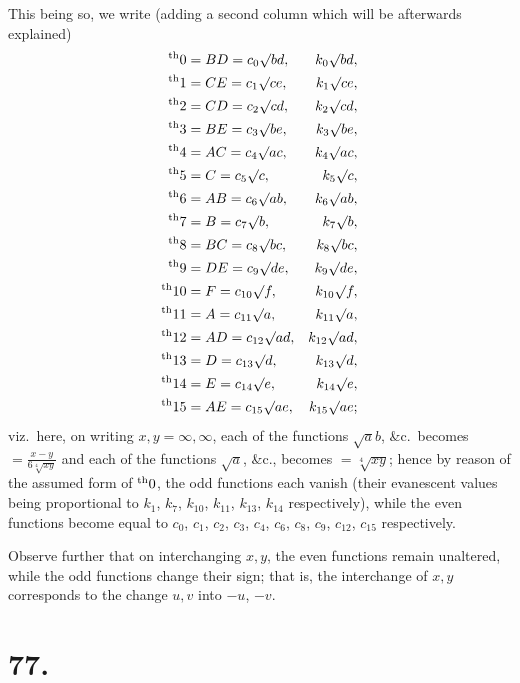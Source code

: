\documentclass[11pt,a4paper]{book}
\providecommand{\uth}{\textsuperscript{th}}
\begin{document}
This being so, we write (adding a second column which will be afterwards explained)
\begin{align*}
\uth{0} &= BD = c_0\surd bd, & k_0\surd bd, \\
\uth{1} &= CE = c_1\surd ce, & k_1\surd ce, \\
\uth{2} &= CD = c_2\surd cd, & k_2\surd cd, \\
\uth{3} &= BE = c_3\surd be, & k_3\surd be, \\
\uth{4} &= AC = c_4\surd ac, & k_4\surd ac, \\
\uth{5} &= C = c_5\surd c, & k_5\surd c, \\
\uth{6} &= AB = c_6\surd ab, & k_6\surd ab, \\
\uth{7} &= B = c_7\surd b, & k_7\surd b, \\
\uth{8} &= BC = c_8\surd bc, & k_8\surd bc, \\
\uth{9} &= DE = c_9\surd de, & k_9\surd de, \\
\uth{10} &= F = c_{10}\surd f, & k_{10}\surd f, \\
\uth{11} &= A = c_{11}\surd a, & k_{11}\surd a, \\
\uth{12} &= AD = c_{12}\surd ad, & k_{12}\surd ad, \\
\uth{13} &= D = c_{13}\surd d, & k_{13}\surd d, \\
\uth{14} &= E = c_{14}\surd e, & k_{14}\surd e, \\
\uth{15} &= AE = c_{15}\surd ae, & k_{15}\surd ae;
\end{align*}
viz.\ here, on writing $x,y = \infty, \infty$, each of the functions $\surd ab$, \&c.\ becomes $=\frac{x-y}{6\sqrt[4]{xy}}$ and each of the functions $\surd a$, \&c., becomes $=\sqrt[4]{xy}$; hence by reason of the assumed form of $\uth{0}$, the odd functions each vanish (their evanescent values being proportional to $k_1$, $k_7$, $k_{10}$, $k_{11}$, $k_{13}$, $k_{14}$ respectively), while the even functions become equal to $c_0$, $c_1$, $c_2$, $c_3$, $c_4$, $c_6$, $c_8$, $c_9$, $c_{12}$, $c_{15}$ respectively.

Observe further that on interchanging $x,y$, the even functions remain unaltered, while the odd functions change their sign; that is, the interchange of $x,y$ corresponds to the change $u,v$ into $-u$, $-v$.

\section*{77.}
\label{sec:77}
\end{document}
